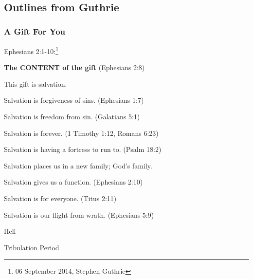 \subsection{Outlines from Guthrie}

\subsubsection{A Gift For You}
Ephesians 2:1-10:\footnote{06 September 2014, Stephen Guthrie}
\begin{compactenum}[I.]
    \item \textbf{The CONTENT of the gift}  (Ephesians 2:8)
    \begin{compactenum}[A.]
    	\item This gift is salvation.
    	\begin{compactenum}[1.]
    		\item Salvation is forgiveness of sins.  (Ephesians 1:7)
    		\item Salvation is freedom from sin.  (Galatians 5:1)
    		\item Salvation is forever. (1 Timothy 1:12,  Romans 6:23)
    		\item Salvation is having a fortress to run to.  (Psalm 18:2)
    		\item Salvation places us in a new family; God's family.
    		\item Salvation gives us a function.  (Ephesians 2:10)
    		\item Salvation is for everyone.   (Titus 2:11)
    		\item Salvation is our flight from wrath.  (Ephesians 5:9)
    		\begin{compactenum}[i.]
    			\item Hell
    			\item Tribulation Period
    		\end{compactenum}
    	\end{compactenum}

\end{compactenum}
\end{compactenum}
